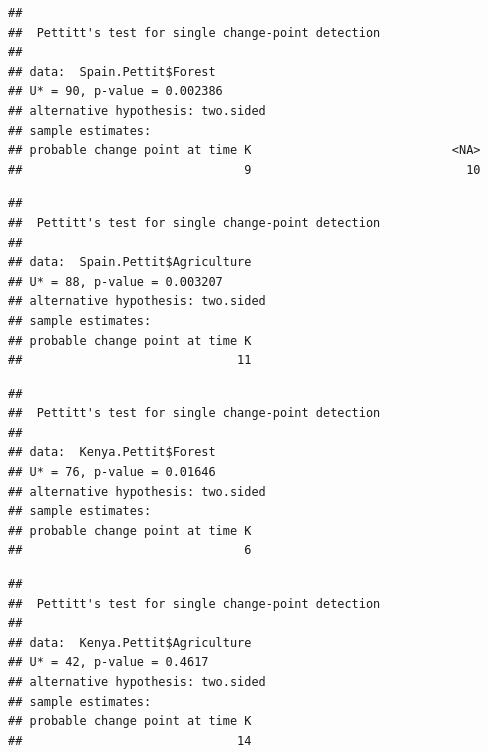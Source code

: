 \documentclass[12pt,]{article}
\newenvironment{Shaded}{\begin{snugshade}}{\end{snugshade}}
\newcommand{\KeywordTok}[1]{\textcolor[rgb]{0.13,0.29,0.53}{\textbf{#1}}}
\newcommand{\StringTok}[1]{\textcolor[rgb]{0.31,0.60,0.02}{#1}}
\newcommand{\CommentTok}[1]{\textcolor[rgb]{0.56,0.35,0.01}{\textit{#1}}}
\newcommand{\OperatorTok}[1]{\textcolor[rgb]{0.81,0.36,0.00}{\textbf{#1}}}
\newcommand{\NormalTok}[1]{#1}
\begin{document}
\begin{verbatim}
## 
##  Pettitt's test for single change-point detection
## 
## data:  Spain.Pettit$Forest
## U* = 90, p-value = 0.002386
## alternative hypothesis: two.sided
## sample estimates:
## probable change point at time K                            <NA> 
##                               9                              10
\end{verbatim}

\begin{Shaded}
\end{Shaded}

\begin{verbatim}
## 
##  Pettitt's test for single change-point detection
## 
## data:  Spain.Pettit$Agriculture
## U* = 88, p-value = 0.003207
## alternative hypothesis: two.sided
## sample estimates:
## probable change point at time K 
##                              11
\end{verbatim}

\begin{Shaded}
\end{Shaded}

\begin{verbatim}
## 
##  Pettitt's test for single change-point detection
## 
## data:  Kenya.Pettit$Forest
## U* = 76, p-value = 0.01646
## alternative hypothesis: two.sided
## sample estimates:
## probable change point at time K 
##                               6
\end{verbatim}

\begin{Shaded}
\end{Shaded}

\begin{verbatim}
## 
##  Pettitt's test for single change-point detection
## 
## data:  Kenya.Pettit$Agriculture
## U* = 42, p-value = 0.4617
## alternative hypothesis: two.sided
## sample estimates:
## probable change point at time K 
##                              14
\end{verbatim}
\end{document}
